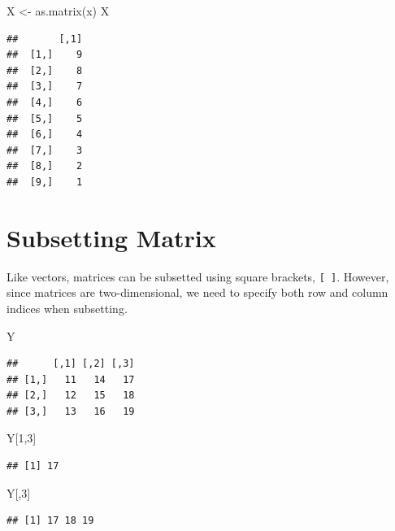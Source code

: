 \documentclass[
]{book}
\newenvironment{Shaded}{\begin{snugshade}}{\end{snugshade}}
\newcommand{\DecValTok}[1]{\textcolor[rgb]{0.00,0.00,0.81}{#1}}
\newcommand{\FunctionTok}[1]{\textcolor[rgb]{0.00,0.00,0.00}{#1}}
\newcommand{\NormalTok}[1]{#1}
\newcommand{\OtherTok}[1]{\textcolor[rgb]{0.56,0.35,0.01}{#1}}
\theoremstyle{definition}
\theoremstyle{definition}
\theoremstyle{definition}
\theoremstyle{definition}
\theoremstyle{remark}
\begin{document}
\begin{Shaded}
\begin{Highlighting}[]
\NormalTok{X }\OtherTok{\textless{}{-}} \FunctionTok{as.matrix}\NormalTok{(x)}
\NormalTok{X}
\end{Highlighting}
\end{Shaded}

\begin{verbatim}
##       [,1]
##  [1,]    9
##  [2,]    8
##  [3,]    7
##  [4,]    6
##  [5,]    5
##  [6,]    4
##  [7,]    3
##  [8,]    2
##  [9,]    1
\end{verbatim}

\hypertarget{subsetting-matrix}{%
\section{Subsetting Matrix}\label{subsetting-matrix}}

Like vectors, matrices can be subsetted using square brackets, \texttt{{[}\ {]}}. However, since matrices are two-dimensional, we need to specify both row and column indices when subsetting.

\begin{Shaded}
\begin{Highlighting}[]
\NormalTok{Y}
\end{Highlighting}
\end{Shaded}

\begin{verbatim}
##      [,1] [,2] [,3]
## [1,]   11   14   17
## [2,]   12   15   18
## [3,]   13   16   19
\end{verbatim}

\begin{Shaded}
\begin{Highlighting}[]
\NormalTok{Y[}\DecValTok{1}\NormalTok{,}\DecValTok{3}\NormalTok{]}
\end{Highlighting}
\end{Shaded}

\begin{verbatim}
## [1] 17
\end{verbatim}

\begin{Shaded}
\begin{Highlighting}[]
\NormalTok{Y[,}\DecValTok{3}\NormalTok{]}
\end{Highlighting}
\end{Shaded}

\begin{verbatim}
## [1] 17 18 19
\end{verbatim}
\end{document}
